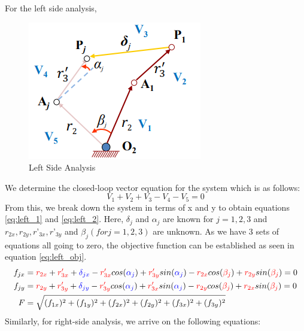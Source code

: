 \documentclass[12pt]{article}
\begin{document}
For the left side analysis,
\begin{figure}
    \centering
    \includegraphics{MG_4.png}
    \caption{Left Side Analysis}
\end{figure}
We determine the closed-loop vector equation for the system which is as follows:
\begin{equation}
    V_1+V_2+V_3-V_4-V_5=0
\end{equation}
From this, we break down the system in terms of x and y to obtain equations \ref{eq:left_1} and \ref{eq:left_2}. Here, $\delta_j$ and $\alpha_j$ are known for $j = 1, 2, 3$ and $r_{2x}, r_{2y}, r’_{3x}, r’_{3y}$ and $\beta_j (for j = 1, 2, 3)$ are unknown. 
As we have 3 sets of equations all going to zero, the objective function can be established as seen in equation \ref{eq:left_obj}.
\begin{align}
    f_{jx}&=\color{red}r_{2x}\color{black}+\color{red}r'_{3x}\color{black}+\color{blue}\delta_{jx}\color{black}-\color{red}r'_{3x}\color{black}cos(\color{blue}\alpha_j\color{black})+\color{red}r'_{3y}\color{black}sin(\color{blue}\alpha_j\color{black})-\color{red}r_{2x}\color{black}cos(\color{red}\beta_j\color{black})+\color{red}r_{2y}\color{black}sin(\color{red}\beta_j\color{black})=0\label{eq:left_1}\\
    f_{jy}&=\color{red}r_{2y}\color{black}+\color{red}r'_{3y}\color{black}+\color{blue}\delta_{jy}\color{black}-\color{red}r'_{3y}\color{black}cos(\color{blue}\alpha_j\color{black})+\color{red}r'_{3x}\color{black}sin(\color{blue}\alpha_j\color{black})-\color{red}r_{2y}\color{black}cos(\color{red}\beta_j\color{black})+\color{red}r_{2x}\color{black}sin(\color{red}\beta_j\color{black})=0\label{eq:left_2}\\
    F&=\sqrt{(f_{1x})^2+(f_{1y})^2+(f_{2x})^2+(f_{2y})^2+(f_{3x})^2+(f_{3y})^2}\label{eq:left_obj}
\end{align}
Similarly, for right-side analysis, we arrive on the following equations:
\end{document}
